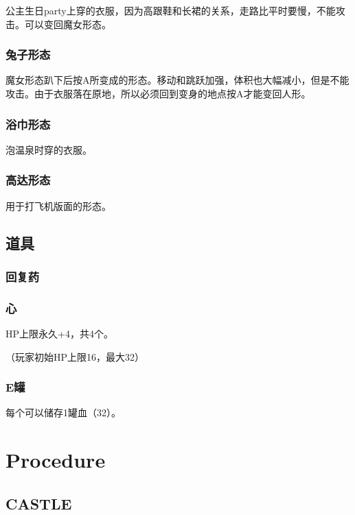 \documentclass{article}
\begin{document}
公主生日party上穿的衣服，因为高跟鞋和长裙的关系，走路比平时要慢，不能攻击。可以变回魔女形态。

\subsubsection{兔子形态}
\label{costume_bunny}

魔女形态趴下后按A所变成的形态。移动和跳跃加强，体积也大幅减小，但是不能攻击。由于衣服落在原地，所以必须回到变身的地点按A才能变回人形。

\subsubsection{浴巾形态}
\label{costume_bathtowel}

泡温泉时穿的衣服。

\subsubsection{高达形态}
\label{costume_gundam}

用于打飞机版面的形态。

\subsection{道具}

\subsubsection{回复药}

\subsubsection{心}

HP上限永久+4，共4个。

（玩家初始HP上限16，最大32）

\subsubsection{E罐}

每个可以储存1罐血（32）。

\section{Procedure}

\subsection{CASTLE}
\end{document}
